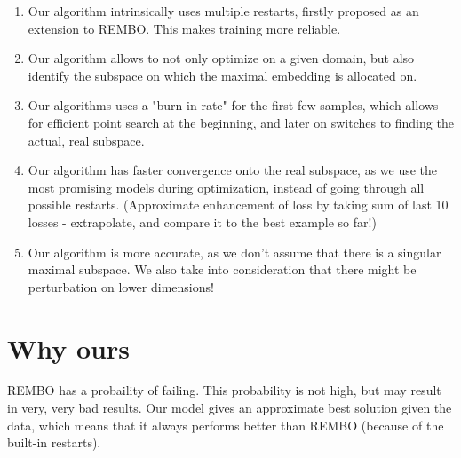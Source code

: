 \begin{enumerate}
\item Our algorithm intrinsically uses multiple restarts, firstly proposed as an extension to REMBO.
This makes training more reliable.
\item Our algorithm allows to not only optimize on a given domain, but also identify the subspace on which the maximal embedding is allocated on.
\item Our algorithms uses a "burn-in-rate" for the first few samples, which allows for efficient point search at the beginning, and later on switches to finding the actual, real subspace.
\item Our algorithm has faster convergence onto the real subspace, as we use the most promising models during optimization, instead of going through all possible restarts. (Approximate enhancement of loss by taking sum of last 10 losses - extrapolate, and compare it to the best example so far!)
\item Our algorithm is more accurate, as we don't assume that there is a singular maximal subspace. 
We also take into consideration that there might be perturbation on lower dimensions!
\end{enumerate}







\section{Why ours}
REMBO has a probaility of failing. This probability is not high, but may result in very, very bad results. 
Our model gives an approximate best solution given the data, which means that it always performs better than REMBO (because of the built-in restarts).


